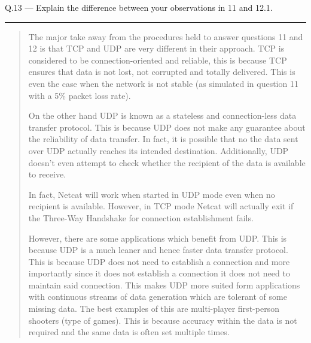 \documentclass{article}
\newcommand\Que[2]{%
\begin{samepage}
\leavevmode\par
\noindent
Q.#1 --- #2\par\vspace{10pt}\hrule\vspace{10pt}
\end{samepage}}
\newenvironment{ans}
{\fbox{Answer}\begin{quote}\nopagebreak}
{\end{quote}}
\begin{document}
\Que{13}{Explain the difference between your observations in 11
and 12.1.}
\begin{ans}
The major take away from the procedures held to answer questions 11 and 12 is
that TCP and UDP are very different in their approach. TCP is considered to be
connection-oriented and reliable, this is because TCP ensures that data is not
lost, not corrupted and totally delivered. This is even the case when the
network is not stable (as simulated in question 11 with a 5\% packet loss rate).

On the other hand UDP is known as a stateless and
connection-less data transfer protocol. This is because UDP
does not make any guarantee about the reliability of data
transfer. In fact, it is possible that no the data sent
over UDP actually reaches its intended destination.
Additionally, UDP doesn't even attempt to check whether the
recipient of the data is available to receive.

In fact, Netcat will work when started in UDP mode even
when no recipient is available. However, in TCP mode Netcat
will actually exit if the Three-Way Handshake for
connection establishment fails.

However, there are some applications which benefit from
UDP. This is because UDP is a much leaner and hence faster
data transfer protocol. This is because UDP does not need
to establish a connection and more importantly since it
does not establish a connection it does not need to
maintain said connection. This makes UDP more suited form
applications with continuous streams of data generation
which are tolerant of some missing data. The best examples
of this are multi-player first-person shooters (type of
games). This is because accuracy within the data is not
required and the same data is often set multiple times.
\end{ans}
\end{document}
